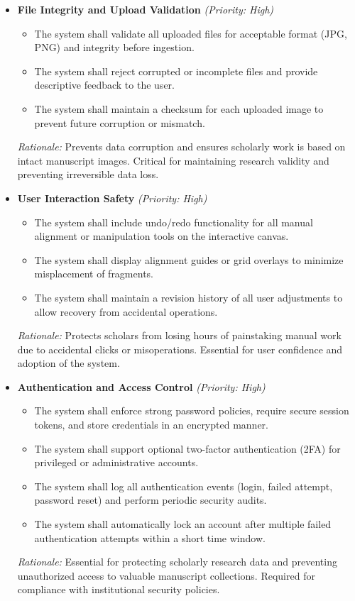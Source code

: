 \documentclass{article}
\begin{document}
\begin{itemize}

    \item \textbf{File Integrity and Upload Validation} \textit{(Priority: High)}
    \begin{itemize}
        \item The system shall validate all uploaded files for acceptable format (JPG, PNG) and integrity before ingestion.
        \item The system shall reject corrupted or incomplete files and provide descriptive feedback to the user.
        \item The system shall maintain a checksum for each uploaded image to prevent future corruption or mismatch.
    \end{itemize}
    \textit{Rationale:} Prevents data corruption and ensures scholarly work is based on intact manuscript images. Critical for maintaining research validity and preventing irreversible data loss.

    \item \textbf{User Interaction Safety} \textit{(Priority: High)}
    \begin{itemize}
        \item The system shall include undo/redo functionality for all manual alignment or manipulation tools on the interactive canvas.
        \item The system shall display alignment guides or grid overlays to minimize misplacement of fragments.
        \item The system shall maintain a revision history of all user adjustments to allow recovery from accidental operations.
    \end{itemize}
    \textit{Rationale:} Protects scholars from losing hours of painstaking manual work due to accidental clicks or misoperations. Essential for user confidence and adoption of the system.

    \item \textbf{Authentication and Access Control} \textit{(Priority: High)}
    \begin{itemize}
        \item The system shall enforce strong password policies, require secure session tokens, and store credentials in an encrypted manner.
        \item The system shall support optional two-factor authentication (2FA) for privileged or administrative accounts.
        \item The system shall log all authentication events (login, failed attempt, password reset) and perform periodic security audits.
        \item The system shall automatically lock an account after multiple failed authentication attempts within a short time window.
    \end{itemize}
    \textit{Rationale:} Essential for protecting scholarly research data and preventing unauthorized access to valuable manuscript collections. Required for compliance with institutional security policies.


\end{itemize}
\end{document}
